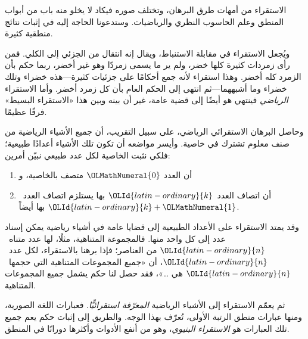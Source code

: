 \documentclass[../../../include/open-logic-section]{subfiles}
\begin{document}


الاستقراء من أمهات طرق البرهان، وتختلف صوره فيكاد لا يخلو منه باب من
أبواب المنطق وعلم الحاسوب النظري والرياضيات. وستدعونا الحاجة إليه في
إثبات نتائج منطقية كثيرة.

ويُجعل الاستقراء في مقابلة الاستنباط، ويقال إنه انتقال من الجزئي إلى
الكلي. فمن رأى زمردات كثيرة كلها خضر، ولم ير ما يسمى زمردًا وهو غير
أخضر، ربما حكم بأن الزمرد كله أخضر. وهذا استقراء لأنه جمع أحكامًا على
جزئيات كثيرة---هذه خضراء وتلك خضراء وما أشبههما---ثم انتهى إلى الحكم
العام بأن كل زمرد أخضر. وأما الاستقراء \emph{الرياضي} فينتهي هو أيضًا
إلى قضية عامة، غير أن بينه وبين هذا «الاستقراء البسيط» فرقًا عظيمًا.

وحاصل البرهان الاستقرائي الرياضي، على سبيل التقريب، أن جميع الأشياء
الرياضية من صنف معلوم تشترك في خاصية. وأيسر مواضعه أن تكون تلك
الأشياء أعدادًا طبيعية؛ فلكي نثبت الخاصية لكل عدد طبيعي نبيّن أمرين:
\begin{enumerate}
    \item أن العدد ${\OLMathNumeral{0}}$ متصف بالخاصية، و
    \item أن اتصاف العدد~${\OLId{latin-ordinary}{k}}$ بها يستلزم اتصاف العدد~${\OLId{latin-ordinary}{k}}+{\OLMathNumeral{1}}$ بها أيضاً.
\end{enumerate}
وقد يمتد الاستقراء على الأعداد الطبيعية إلى قضايا عامة في أشياء
رياضية يمكن إسناد عدد إلى كل واحد منها. فالمجموعة المتناهية، مثلًا،
لها عدد متناه~${\OLId{latin-ordinary}{n}}$ من العناصر؛ فإذا برهنا بالاستقراء، لكل عدد~${\OLId{latin-ordinary}{n}}$، أن
«جميع المجموعات المتناهية التي حجمها~${\OLId{latin-ordinary}{n}}$ هي \dots»، فقد حصل لنا حكم
يشمل جميع المجموعات المتناهية.

ثم يعمّم الاستقراء إلى الأشياء الرياضية \emph{المعرّفة استقرائيًّا}.
فعبارات اللغة الصورية، ومنها عبارات منطق الرتبة الأولى، تُعرّف بهذا
الوجه. والطريق إلى إثبات حكم يعم جميع تلك العبارات هو
\emph{الاستقراء البنيوي}، وهو من أنفع الأدوات وأكثرها دورانًا في
المنطق.
\end{document}
